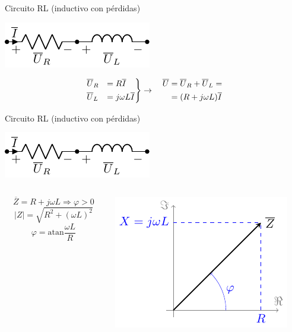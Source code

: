 \documentclass[aspectratio=169, usenames,svgnames,dvipsnames]{beamer}
\newcommand{\atan}{\mathrm{atan}}
\begin{document}
\begin{frame}[label={sec:orgfe5b524}]{Circuito RL (inductivo con pérdidas)}
\begin{center}
\includegraphics[height=0.2\textheight]{../figs/RL.pdf}
\end{center}

\[
\begin{rcases}
  \overline{U}_R &= R \overline{I}\\
  \overline{U}_L &= j\omega L \overline{I}
\end{rcases} \rightarrow \quad
    \begin{aligned}
      \overline{U} &= \overline{U}_R + \overline{U}_L =\\
		   &=(R + j\omega L) \overline{I}
    \end{aligned}
\]
\end{frame}
\begin{frame}[label={sec:orga497edd}]{Circuito RL (inductivo con pérdidas)}
\begin{center}
\includegraphics[height=0.2\textheight]{../figs/RL.pdf}
\end{center}

\begin{columns}
\begin{column}{0.45\columnwidth}
\[
\overline{Z} = R + j\omega L \Rightarrow \boxed{\varphi > 0}
\]
\[
  |Z| = \sqrt{R^2 + (\omega L)^2}
\]
\[
  \varphi = \atan{\dfrac{\omega L}{R}}
\]
\end{column}

\begin{column}{0.55\columnwidth}
\begin{center}
\includegraphics[width=.9\linewidth]{../figs/fasorInductanciaReal.pdf}
\end{center}
\end{column}
\end{columns}
\end{frame}
\end{document}
